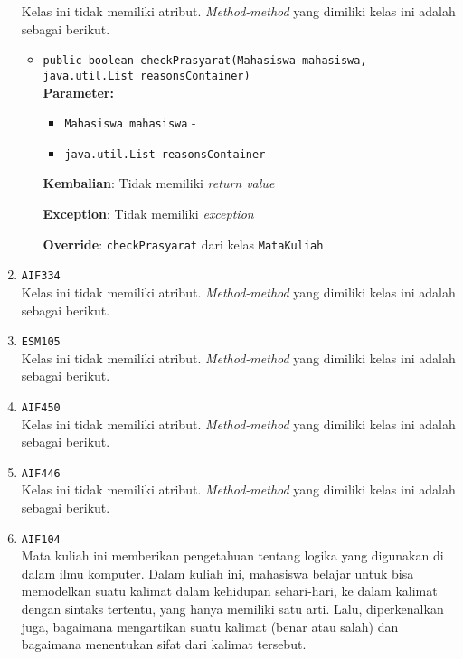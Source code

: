 \documentclass{article}
\begin{document}
\begin{enumerate}
Kelas ini tidak memiliki atribut. \textit{Method-method} yang dimiliki kelas ini adalah sebagai berikut.
\begin{itemize}
\item \texttt{public boolean checkPrasyarat(Mahasiswa mahasiswa, java.util.List reasonsContainer)}\\ 


\textbf{Parameter:}\begin{itemize}
\item \texttt{Mahasiswa mahasiswa} - 
\item \texttt{java.util.List reasonsContainer} - 
\end{itemize}
\textbf{Kembalian}: Tidak memiliki \textit{return value}

\textbf{Exception}: Tidak memiliki \textit{exception}

\textbf{Override}: \texttt{checkPrasyarat} dari kelas \texttt{MataKuliah}

\end{itemize}
\item \texttt{AIF334}\\ 
Kelas ini tidak memiliki atribut. \textit{Method-method} yang dimiliki kelas ini adalah sebagai berikut.
\begin{itemize}
\end{itemize}
\item \texttt{ESM105}\\ 
Kelas ini tidak memiliki atribut. \textit{Method-method} yang dimiliki kelas ini adalah sebagai berikut.
\begin{itemize}
\end{itemize}
\item \texttt{AIF450}\\ 
Kelas ini tidak memiliki atribut. \textit{Method-method} yang dimiliki kelas ini adalah sebagai berikut.
\begin{itemize}
\end{itemize}
\item \texttt{AIF446}\\ 
Kelas ini tidak memiliki atribut. \textit{Method-method} yang dimiliki kelas ini adalah sebagai berikut.
\begin{itemize}
\end{itemize}
\item \texttt{AIF104}\\ 
Mata kuliah ini memberikan pengetahuan tentang logika yang digunakan di 
 dalam ilmu komputer. Dalam kuliah ini, mahasiswa belajar untuk bisa 
 memodelkan suatu kalimat dalam kehidupan sehari-hari, ke dalam kalimat 
 dengan sintaks tertentu, yang hanya memiliki satu arti. Lalu, diperkenalkan 
 juga, bagaimana mengartikan suatu kalimat (benar atau salah) dan bagaimana 
 menentukan sifat dari kalimat tersebut.


\end{enumerate}
\end{document}
